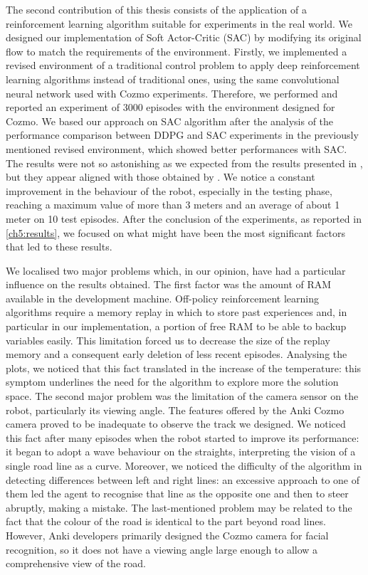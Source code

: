 The second contribution of this thesis consists of the application of a reinforcement learning algorithm suitable for experiments in the real world.
We designed our implementation of Soft Actor-Critic (SAC) by modifying its original flow to match the requirements of the environment.
Firstly, we implemented a revised environment of a traditional control problem to apply deep reinforcement learning algorithms instead of traditional ones, using the same convolutional neural network used with Cozmo experiments.
Therefore, we performed and reported an experiment of 3000 episodes with the environment designed for Cozmo.
We based our approach on SAC algorithm after the analysis of the performance comparison between DDPG and SAC experiments in the previously mentioned revised environment, which showed better performances with SAC.
The results were not so astonishing as we expected from the results presented in \cite{kendall2018learning,kendall2019learning}, but they appear aligned with those obtained by \cite{haarnoja2018alg}.
We notice a constant improvement in the behaviour of the robot, especially in the testing phase, reaching a maximum value of more than 3 meters and an average of about 1 meter on 10 test episodes.
After the conclusion of the experiments, as reported in \vref{ch5:results}, we focused on what might have been the most significant factors that led to these results.

We localised two major problems which, in our opinion, have had a particular influence on the results obtained.
The first factor was the amount of RAM available in the development machine.
Off-policy reinforcement learning algorithms require a memory replay in which to store past experiences and, in particular in our implementation, a portion of free RAM to be able to backup variables easily.
This limitation forced us to decrease the size of the replay memory and a consequent early deletion of less recent episodes.
Analysing the plots, we noticed that this fact translated in the increase of the temperature: this symptom underlines the need for the algorithm to explore more the solution space.
The second major problem was the limitation of the camera sensor on the robot, particularly its viewing angle.
The features offered by the Anki Cozmo camera proved to be inadequate to observe the track we designed.
We noticed this fact after many episodes when the robot started to improve its performance: it began to adopt a wave behaviour on the straights, interpreting the vision of a single road line as a curve.
Moreover, we noticed the difficulty of the algorithm in detecting differences between left and right lines: an excessive approach to one of them led the agent to recognise that line as the opposite one and then to steer abruptly, making a mistake.
The last-mentioned problem may be related to the fact that the colour of the road is identical to the part beyond road lines.
However, Anki developers primarily designed the Cozmo camera for facial recognition, so it does not have a viewing angle large enough to allow a comprehensive view of the road.



